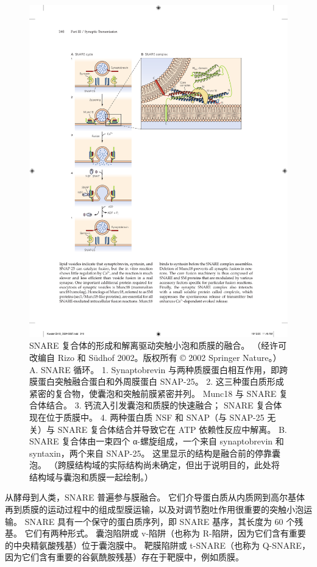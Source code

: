 \begin{figure}[htbp]
	\centering
	\includegraphics[width=0.8\linewidth]{chap15/fig_15_12}
	\caption{SNARE 复合体的形成和解离驱动突触小泡和质膜的融合。 （经许可改编自 Rizo 和 Südhof 2002。版权所有 © 2002 Springer Nature。） A. SNARE 循环。 1. Synaptobrevin 与两种质膜蛋白相互作用，即跨膜蛋白突触融合蛋白和外周膜蛋白 SNAP-25。 2. 这三种蛋白质形成紧密的复合物，使囊泡和突触前膜紧密并列。 Munc18 与 SNARE 复合体结合。 3. 钙流入引发囊泡和质膜的快速融合； SNARE 复合体现在位于质膜中。 4. 两种蛋白质 NSF 和 SNAP（与 SNAP-25 无关）与 SNARE 复合体结合并导致它在 ATP 依赖性反应中解离。 B. SNARE 复合体由一束四个 α-螺旋组成，一个来自 synaptobrevin 和 syntaxin，两个来自 SNAP-25。 这里显示的结构是融合前的停靠囊泡。 （跨膜结构域的实际结构尚未确定，但出于说明目的，此处将结构域与囊泡和质膜一起绘制。）}
	\label{fig:15_12}
\end{figure}


从酵母到人类，SNARE 普遍参与膜融合。
它们介导蛋白质从内质网到高尔基体再到质膜的运动过程中的组成型膜运输，以及对调节胞吐作用很重要的突触小泡运输。
SNARE 具有一个保守的蛋白质序列，即 SNARE 基序，其长度为 60 个残基。
它们有两种形式。
囊泡陷阱或 v-陷阱（也称为 R-陷阱，因为它们含有重要的中央精氨酸残基）位于囊泡膜中。
靶膜陷阱或 t-SNARE（也称为 Q-SNARE，因为它们含有重要的谷氨酰胺残基）存在于靶膜中，例如质膜。


